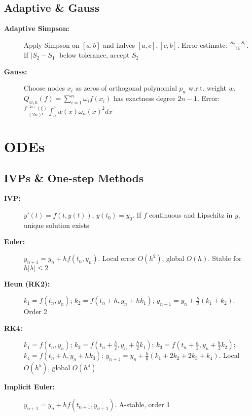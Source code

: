 \documentclass[a4paper,10pt,landscape]{article}
\begin{document}
\begin{multicols*}{3}
    \subsection*{Adaptive \& Gauss}
    \begin{description}
        \item[\textbf{Adaptive Simpson:}] Apply Simpson on $[a,b]$ and halves $[a,c],[c,b]$. Error estimate: $\frac{S_2-S_1}{15}$. If $|S_2-S_1|$ below tolerance, accept $S_2$
        \item[\textbf{Gauss:}] Choose nodes $x_i$ as zeros of orthogonal polynomial $p_n$ w.r.t. weight $w$. $Q_{w,n}(f) = \sum_{i=1}^n \omega_i f(x_i)$ has exactness degree $2n-1$. Error: $\frac{f^{(2n)}(\xi)}{(2n)!}\int_a^b w(x)\omega_n(x)^2 dx$
    \end{description}
    \section*{ODEs}
    \subsection*{IVPs \& One-step Methods}
    \begin{description}
        \item[\textbf{IVP:}] $y'(t)=f(t,y(t))$, $y(t_0)=y_0$. If $f$ continuous and Lipschitz in $y$, unique solution exists
        \item[\textbf{Euler:}] $y_{n+1} = y_n + hf(t_n,y_n)$. Local error $O(h^2)$, global $O(h)$. Stable for $h|\lambda| \leq 2$
        \item[\textbf{Heun (RK2):}] $k_1 = f(t_n,y_n)$; $k_2 = f(t_n+h,y_n+hk_1)$; $y_{n+1} = y_n + \frac{h}{2}(k_1+k_2)$. Order 2
        \item[\textbf{RK4:}] $k_1 = f(t_n,y_n)$; $k_2 = f(t_n+\frac{h}{2},y_n+\frac{h}{2}k_1)$; $k_3 = f(t_n+\frac{h}{2},y_n+\frac{h}{2}k_2)$; $k_4 = f(t_n+h,y_n+hk_3)$; $y_{n+1} = y_n + \frac{h}{6}(k_1+2k_2+2k_3+k_4)$. Local $O(h^5)$, global $O(h^4)$
        \item[\textbf{Implicit Euler:}] $y_{n+1} = y_n + hf(t_{n+1},y_{n+1})$. A-stable, order 1
    \end{description}


\end{multicols*}
\end{document}
